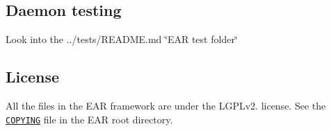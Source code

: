 \subsection*{Daemon testing }

Look into the ../tests/\+R\+E\+A\+D\+ME.md \char`\"{}\+E\+A\+R test folder\char`\"{}

\subsection*{License }

All the files in the E\+AR framework are under the L\+G\+P\+Lv2. license. See the \href{../../COPYING}{\tt C\+O\+P\+Y\+I\+NG} file in the E\+AR root directory. 